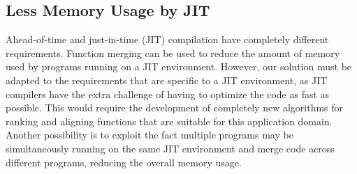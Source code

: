 \subsection{Less Memory Usage by JIT}

Ahead-of-time and just-in-time (JIT) compilation have completely different requirements.
Function merging can be used to reduce the amount of memory used by programs running on a JIT environment.
However, our solution must be adapted to the requirements that are specific to a JIT environment, as JIT compilers have the extra challenge of having to optimize the code as fast as possible.
This would require the development of completely new algorithms for ranking and aligning functions that are suitable for this application domain.
Another possibility is to exploit the fact multiple programs may be simultaneously running on the same JIT environment and merge code across different programs, reducing the overall memory usage.

